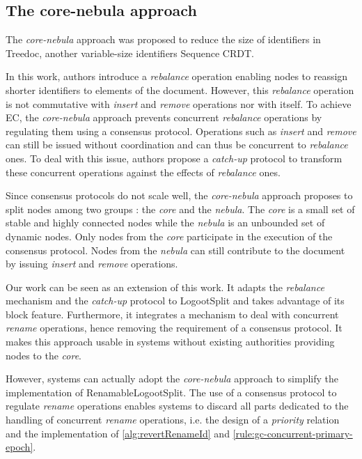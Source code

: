 \documentclass[10pt,journal,compsoc]{IEEEtran}
\newcommand{\ie}{i.e. }
\begin{document}
\subsection{The core-nebula approach}

The \emph{core-nebula} approach \cite{letia:hal-01248270, zawirski:hal-01248197} was proposed to reduce the size of identifiers in Treedoc\cite{5158449}, another variable-size identifiers Sequence \ac{CRDT}.

In this work, authors introduce a \emph{rebalance} operation enabling nodes to reassign shorter identifiers to elements of the document.
However, this \emph{rebalance} operation is not commutative with \emph{insert} and \emph{remove} operations nor with itself.
To achieve \ac{EC}\cite{10.1145/224057.224070}, the \emph{core-nebula} approach prevents concurrent \emph{rebalance} operations by regulating them using a consensus protocol.
Operations such as \emph{insert} and \emph{remove} can still be issued without coordination and can thus be concurrent to \emph{rebalance} ones.
To deal with this issue, authors propose a \emph{catch-up} protocol to transform these concurrent operations against the effects of \emph{rebalance} ones.

Since consensus protocols do not scale well, the \emph{core-nebula} approach proposes to split nodes among two groups : the \emph{core} and the \emph{nebula}.
The \emph{core} is a small set of stable and highly connected nodes while the \emph{nebula} is an unbounded set of dynamic nodes.
Only nodes from the \emph{core} participate in the execution of the consensus protocol.
Nodes from the \emph{nebula} can still contribute to the document by issuing \emph{insert} and \emph{remove} operations.

Our work can be seen as an extension of this work.
It adapts the \emph{rebalance} mechanism and the \emph{catch-up} protocol to LogootSplit and takes advantage of its block feature.
Furthermore, it integrates a mechanism to deal with concurrent \emph{rename} operations, hence removing the requirement of a consensus protocol.
It makes this approach usable in systems without existing authorities providing nodes to the \emph{core}.

However, systems can actually adopt the \emph{core-nebula} approach to simplify the implementation of RenamableLogootSplit.
The use of a consensus protocol to regulate \emph{rename} operations enables systems to discard all parts dedicated to the handling of concurrent \emph{rename} operations, \ie the design of a \emph{priority} relation and the implementation of \autoref{alg:revertRenameId} and \autoref{rule:gc-concurrent-primary-epoch}.
\end{document}
